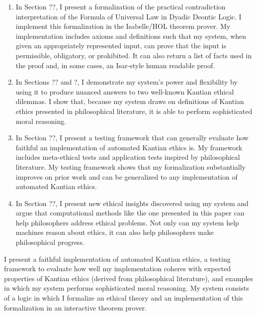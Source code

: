 \begin{isabellebody}
\begin{isamarkuptext}
\begin{enumerate}
\item In Section ??, I present a formalization of the practical contradiction interpretation of the 
Formula of Universal Law in Dyadic Deontic Logic. I implement this formalization in the Isabelle/HOL
theorem prover. My implementation includes axioms and definitions such that my system, when given an appropriately
represented input, can prove that the input is permissible, obligatory, or prohibited. It can also return
a list of facts used in the proof and, in some cases, an Isar-style human readable proof. 

\item In Sections ?? and ?, I demonstrate my system's power and flexibility by 
using it to produce nuanced answers to two well-known Kantian ethical dilemmas. I show that, because 
my system draws on definitions of Kantian ethics presented in philosophical literature, it is able 
to perform sophisticated moral reasoning. 

\item In Section ??, I present a testing framework that can generally evaluate how faithful an implementation 
of automated Kantian ethics is. My framework includes meta-ethical tests and application tests inspired by philosophical
literature. My testing framework shows that my formalization substantially improves on prior work and can 
be generalized to any implementation of automated Kantian ethics.

\item In Section ??, I present new ethical insights discovered using my system and argue that
computational methods like the one presented in this paper can help philosophers address ethical problems.
Not only can my system help machines reason about ethics, it can also help philosophers make philosophical
progress.
\end{enumerate}%
\end{isamarkuptext}\isamarkuptrue%
%
\begin{isamarkuptext}%
I present a faithful implementation of automated Kantian ethics, a testing framework to evaluate how 
well my implementation coheres with expected properties of Kantian ethics (derived from philosophical 
literature), and examples in which my system performs sophisticated moral reasoning. My system consists 
of a logic in which I formalize an ethical theory and an implementation of this formalization in an 
interactive theorem prover. 


\end{isamarkuptext}
\end{isabellebody}
